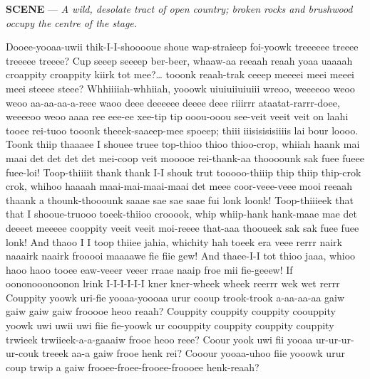 \documentclass[12pt,a4paper]{article}
\renewcommand{\sc}[1]{\textsc{\MakeUppercase{#1}}}
\begin{document}

\DramPer

\newpage

\noindent
\textbf{\sc{SCENE}} — \textit{A wild, desolate tract of open country; broken rocks and brushwood occupy the centre of the stage.}
\vspace{.5em}

\begin{drama}
\sloppy

\euelspeaks
  Dooee-yooaa-uwii thik-I-I-shooooue shoue wap-straieep foi-yoowk treeeeee treeee treeeee treeee?
\pistspeaks
  Cup seeep seeeep ber-beer, whaaw-aa reeaah reaah yoaa uaaaah croappity croappity kiirk tot mee?… tooonk reaah-trak ceeep meeeei meei meeei meei steeee steee?
\euelspeaks
Whhiiiiah-whhiiah, yooowk uiuiuiiuiuiii wreoo, weeeeoo weoo weoo aa-aa-aa-a-reee waoo deee deeeeee deeee deee riiirrr ataatat-rarrr-doee, weeeeoo weoo aaaa ree eee-ee xee-tip tip ooou-ooou see-veit veeit veit on laahi tooee rei-tuoo tooonk theeek-saaeep-mee spoeep; thiii iiisisisisiiiis lai bour loooo.
\pistspeaks
Toonk thiip thaaaee I shouee truee top-thioo thioo thioo-crop, whiiah haank mai maai det det det det mei-coop veit mooooe rei-thank-aa thoooounk sak fuee fueee fuee-loi! Toop-thiiiit thank thank I-I shouk trut tooooo-thiiip thip thiip thip-crok crok, whihoo haaaah maai-mai-maai-maai det meee coor-veee-veee mooi reeaah thaank a thounk-thooounk saaae sae sae saae fui lonk loonk! Toop-thiiieek that that I shooue-truooo toeek-thiioo crooook, whip whiip-hank hank-maae mae det deeeet meeeee cooppity veeit veeit moi-reeee that-aaa thooueek sak sak fuee fuee lonk!
\euelspeaks
And thaoo I I toop thiiee jahia, whichity hah toeek era veee rerrr nairk naaairk naairk frooooi maaaawe fie fiie gew! And thaee-I-I tot thioo jaaa, whioo haoo haoo tooee eaw-veeer veeer rraae naaip froe mii fie-geeew!
\pistspeaks
If oononooonoonon lrink I-I-I-I-I-I kner kner-wheek wheek reerrr wek wet rerrr
\euelspeaks
Couppity yoowk uri-fie yooaa-yoooaa urur cooup trook-trook a-aa-aa-aa gaiw gaiw gaiw gaiw frooooe heoo reaah? Couppity couppity couppity coouppity yoowk uwi uwii uwi fiie fie-yoowk ur coouppity couppity couppity couppity trwieek trwiieek-a-a-gaaaiw frooe heoo reee? Coour yook uwi fii yooaa ur-ur-ur-ur-couk treeek aa-a gaiw frooe henk rei? Cooour yooaa-uhoo fiie yooowk urur coup trwip a gaiw frooee-froee-frooee-froooee henk-reaah?

\end{drama}
\end{document}
